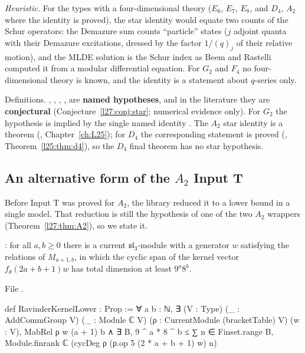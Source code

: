 \begin{physics}
\emph{Heuristic.} For the types with a four-dimensional theory ($E_6$, $E_7$, $E_8$, and $D_4$, $A_2$ where the identity is proved),
the star identity would equate two counts of the Schur operators: the Demazure sum counts ``particle'' states ($j$ adjoint quanta with
their Demazure excitations, dressed by the factor $1/(q)_j$ of their relative motion), and the MLDE solution is the Schur index as
Beem and Rastelli computed it from a modular differential equation. For $G_2$ and $F_4$ no four-dimensional theory is known, and the
identity is a statement about $q$-series only.
\end{physics}

\begin{status}
Definitions. , , , ,  are \textbf{named
hypotheses}, and in the literature they are \textbf{conjectural} (Conjecture~\ref{l27:conj:star}; numerical evidence only). For
$G_2$ the hypothesis is implied by the single named identity . The $A_2$ star identity is a theorem (, Chapter~\ref{ch:L25}); for $D_4$ the corresponding statement
is proved (, Theorem~\ref{l25:thm:d4}), so the $D_4$ final theorem has no star hypothesis.
\end{status}

\subsection{An alternative form of the \texorpdfstring{$A_2$}{A2} Input T}\label{l27:sec:a2alt}

Before Input T was proved for $A_2$, the library reduced it to a lower bound in a single model. That reduction is still the
hypothesis of one of the two $A_2$ wrappers (Theorem~\ref{l27:thm:A2}), so we state it.

\begin{definition}\label{l27:def:a2alt}
: for all $a,b\ge0$ there is a current $\mathfrak{sl}_3$-module with a generator $w$ satisfying the
relations of $M_{a+1,b}$, in which the cyclic span of the kernel vector $f_\theta(2a+b+1)w$ has total dimension at least $9^a8^b$.
\end{definition}
\noindent File .
\begin{leancode}
def RavinderKernelLower : Prop :=
  ∀ a b : ℕ, ∃ (V : Type) (_ : AddCommGroup V) (_ : Module ℂ V) (ρ : CurrentModule (bracketTable) V)
    (w : V), MabRel ρ w (a + 1) b ∧
    ∃ B, 9 ^ a * 8 ^ b ≤ ∑ n ∈ Finset.range B,
      Module.finrank ℂ (cycDeg ρ (ρ.op 5 (2 * a + b + 1) w) n)
\end{leancode}

